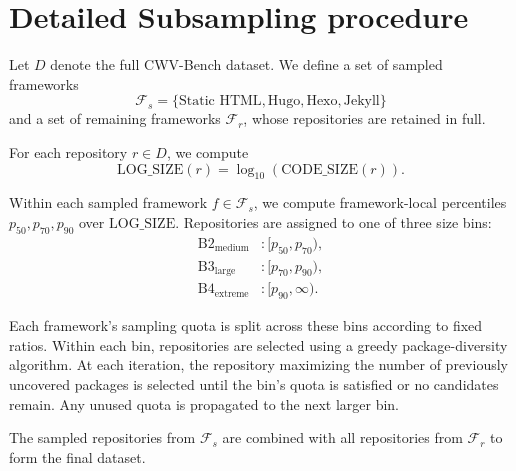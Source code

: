 \section {Detailed Subsampling procedure}
Let $D$ denote the full CWV-Bench dataset.
We define a set of sampled frameworks
$$\mathcal{F}_s = \{\text{Static HTML}, \text{Hugo}, \text{Hexo}, \text{Jekyll}\}$$
and a set of remaining frameworks $\mathcal{F}_r$, whose repositories are retained in full.

For each repository $r \in D$, we compute
\[
\text{LOG\_SIZE}(r) = \log_{10}(\text{CODE\_SIZE}(r)).
\]

Within each sampled framework $f \in \mathcal{F}_s$, we compute framework-local percentiles
$p_{50}, p_{70}, p_{90}$ over $\text{LOG\_SIZE}$.
Repositories are assigned to one of three size bins:
\[
\begin{aligned}
\text{B2}_{\text{medium}} &: [p_{50}, p_{70}), \\
\text{B3}_{\text{large}} &: [p_{70}, p_{90}), \\
\text{B4}_{\text{extreme}} &: [p_{90}, \infty).
\end{aligned}
\]

Each framework’s sampling quota is split across these bins according to fixed ratios.
Within each bin, repositories are selected using a greedy package-diversity algorithm.
At each iteration, the repository maximizing the number of previously uncovered packages is selected until the bin’s quota is satisfied or no candidates remain.
Any unused quota is propagated to the next larger bin.

The sampled repositories from $\mathcal{F}_s$ are combined with all repositories from $\mathcal{F}_r$ to form the final dataset.

